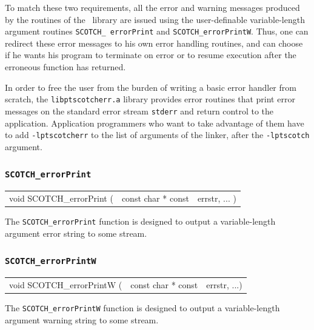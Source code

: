 To match these two requirements, all the error and warning messages
produced by the routines of the \libscotch\ library are issued using
the user-definable variable-length argument routines {\tt SCOTCH\_\lbt
error\lbt Print} and {\tt SCOTCH\_\lbt error\lbt PrintW}. Thus, one
can redirect these error messages to his own error handling routines,
and can choose if he wants his program to terminate on error or to
resume execution after the erroneous function has returned.

In order to free the user from the burden of writing a basic error
handler from scratch, the {\tt libptscotcherr.a} library provides error
routines that print error messages on the standard error stream
{\tt stderr} and return control to the application. Application
programmers who want to take advantage of them have to add
{\tt -lptscotcherr} to the list of arguments of the linker, after
the {\tt -lptscotch} argument.

\subsubsection{{\tt SCOTCH\_errorPrint}}
\label{sec-lib-errorprint}

\begin{itemize}
\progsyn

{\tt\begin{tabular}{l@{}ll}
void SCOTCH\_errorPrint ( & const char * const & errstr, ... )
\end{tabular}}

\progdes

The {\tt SCOTCH\_errorPrint} function is designed to output a
variable-length argument error string to some stream.
\end{itemize}

\subsubsection{{\tt SCOTCH\_errorPrintW}}

\begin{itemize}
\progsyn

{\tt\begin{tabular}{l@{}ll}
void SCOTCH\_errorPrintW ( & const char * const & errstr, ...)
\end{tabular}}

\progdes

The {\tt SCOTCH\_errorPrintW} function is designed to output a
variable-length argument warning string to some stream.
\end{itemize}

